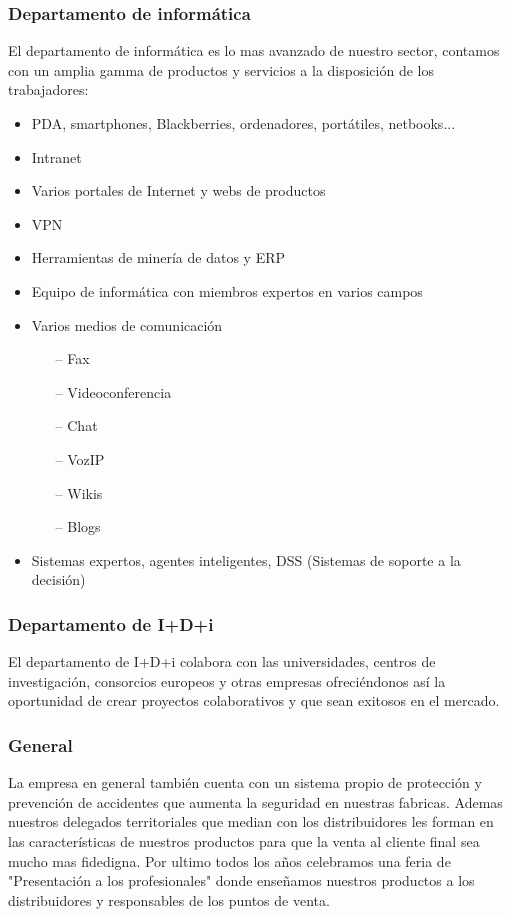 \documentclass[twoside]{article}
\begin{document}
\subsubsection{Departamento de informática}
El departamento de informática es lo mas avanzado de nuestro sector, contamos con un amplia gamma de productos y servicios a la disposición de los trabajadores:
\begin{itemize}
	\item PDA, smartphones, Blackberries, ordenadores, portátiles, netbooks...
	\item Intranet
	\item Varios portales de Internet y webs de productos
	\item VPN
	\item Herramientas de minería de datos y ERP
	\item Equipo de informática con miembros expertos en varios campos
	\item Varios medios de comunicación
		\begin{itemize}
			\item[--] Fax
			\item[--] Videoconferencia
			\item[--] Chat
			\item[--] VozIP
			\item[--] Wikis
			\item[--] Blogs
		\end{itemize}
	\item Sistemas expertos, agentes inteligentes, DSS (Sistemas de soporte a la decisión)
	
\end{itemize}
\subsubsection{Departamento de I+D+i}
El departamento de I+D+i colabora con las universidades, centros de investigación, consorcios europeos y otras empresas ofreciéndonos así la oportunidad de crear proyectos colaborativos y que sean exitosos en el mercado.

\subsubsection{General}
La empresa en general también cuenta con un sistema propio de protección y prevención de accidentes que aumenta la seguridad en nuestras fabricas. Ademas nuestros delegados territoriales que median con los distribuidores les forman en las características de nuestros productos para que la venta al cliente final sea mucho mas fidedigna. Por ultimo todos los años celebramos una feria de "Presentación a los profesionales" donde enseñamos nuestros productos a los distribuidores y responsables de los puntos de venta.
\end{document}
